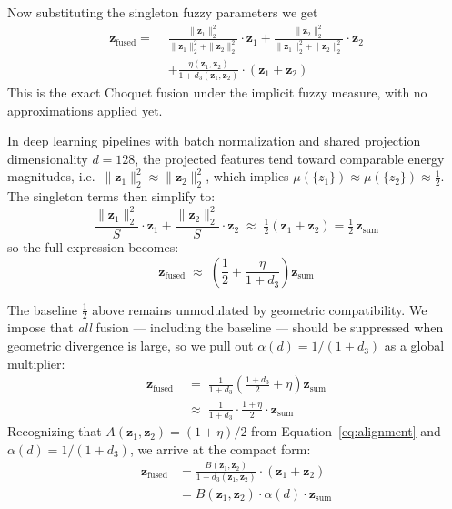 \documentclass[preprint,12pt]{elsarticle}
\begin{document}
Now substituting the singleton fuzzy parameters we get
\begin{equation*}
\begin{aligned}
    \mathbf{z}_{\text{fused}} = \,\, & 
        \frac{\|\mathbf{z}_1\|_2^2}{\|\mathbf{z}_1\|_2^2 + \|\mathbf{z}_2\|_2^2} \cdot \mathbf{z}_1 + 
        \frac{\|\mathbf{z}_2\|_2^2}{\|\mathbf{z}_1\|_2^2 + \|\mathbf{z}_2\|_2^2} \cdot \mathbf{z}_2
     \\
    & + 
        \frac{\eta(\mathbf{z}_1, \mathbf{z}_2)}{1 + d_3(\mathbf{z}_1, \mathbf{z}_2)} \cdot (\mathbf{z}_1 + \mathbf{z}_2)
\end{aligned}
\end{equation*}
This is the exact Choquet fusion under the implicit fuzzy measure, with no approximations applied yet.

In deep learning pipelines with batch normalization and shared projection dimensionality $d{=}128$, the projected features tend toward comparable energy magnitudes, i.e.\ $\|\mathbf{z}_1\|_2^2 \approx \|\mathbf{z}_2\|_2^2$, which implies $\mu(\{z_1\}) \approx \mu(\{z_2\}) \approx \tfrac{1}{2}$. The singleton terms then simplify to:
\begin{equation*}
    \frac{\|\mathbf{z}_1\|_2^2}{S}\cdot\mathbf{z}_1 + \frac{\|\mathbf{z}_2\|_2^2}{S}\cdot\mathbf{z}_2 \;\approx\; \tfrac{1}{2}(\mathbf{z}_1+\mathbf{z}_2) = \tfrac{1}{2}\,\mathbf{z}_{\text{sum}}
\end{equation*}
so the full expression becomes:
\begin{equation*}
    \mathbf{z}_{\text{fused}} \;\approx\; \left(\frac{1}{2} + \frac{\eta}{1+d_3}\right)\mathbf{z}_{\text{sum}}
\end{equation*}

The baseline $\tfrac{1}{2}$ above remains unmodulated by geometric compatibility. We impose that \emph{all} fusion — including the baseline — should be suppressed when geometric divergence is large, so we pull out $\alpha(d) = 1/(1+d_3)$ as a global multiplier:
\begin{align*}
    \mathbf{z}_{\text{fused}} &\;=\; \frac{1}{1+d_3}\!\left(\frac{1+d_3}{2} + \eta\right)\mathbf{z}_{\text{sum}} \\[6pt]
                               &\;\approx\; \frac{1}{1+d_3}\cdot\frac{1+\eta}{2}\cdot\mathbf{z}_{\text{sum}}
\end{align*}
Recognizing that $A(\mathbf{z}_1,\mathbf{z}_2) = (1+\eta)/2$ from Equation~\eqref{eq:alignment} and $\alpha(d) = 1/(1+d_3)$, we arrive at the compact form:
\begin{equation*}
\begin{aligned}
\mathbf{z}_{\text{fused}} 
&= \frac{B(\mathbf{z}_1,\mathbf{z}_2)}{1+d_3(\mathbf{z}_1,\mathbf{z}_2)}
   \cdot(\mathbf{z}_1+\mathbf{z}_2) \\[4pt]
&= B(\mathbf{z}_1,\mathbf{z}_2)\cdot\alpha(d)\cdot\mathbf{z}_{\text{sum}}
\end{aligned}
\end{equation*}
\end{document}
